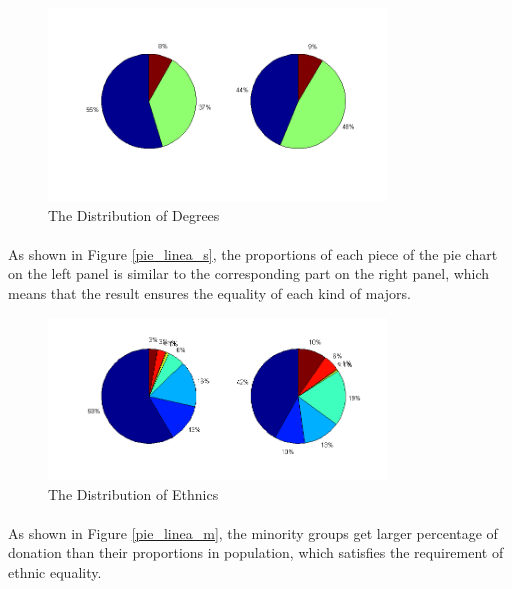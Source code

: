 \documentclass{mcmthesis}
\begin{document}
\begin{figure} [H]
\centering

\includegraphics[width=0.8\textwidth]{pie_linear_subject.png}

\label{pie_linear_s}

\caption{The Distribution of Degrees}

\end{figure}

\paragraph{}As shown in Figure \ref{pie_linea_s}, the proportions of each piece of the pie chart on the left panel is similar to the corresponding part on the right panel, which means that the result ensures the equality of each kind of majors.

\begin{figure} [H]
\centering

\includegraphics[width=0.8\textwidth]{pie_linear_minor.png}

\caption{The Distribution of Ethnics}

\label{pie_linear_m}

\end{figure}

\paragraph{}As shown in Figure \ref{pie_linea_m}, the minority groups get larger percentage of donation than their proportions in population, which satisfies the requirement of ethnic equality. 
\end{document}
